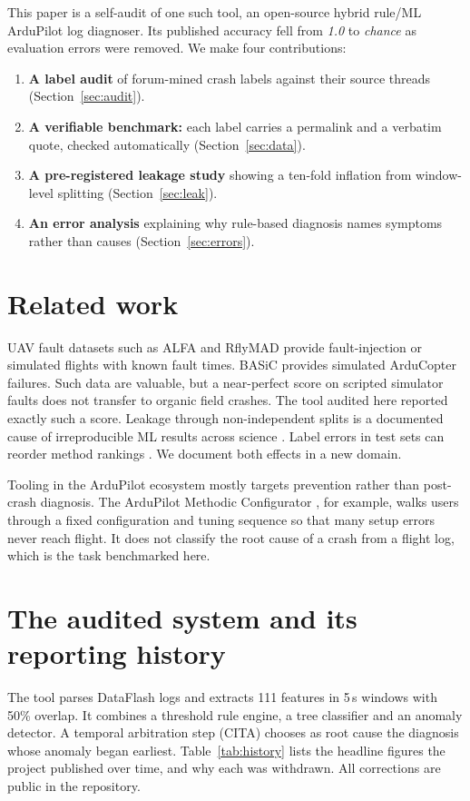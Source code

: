 \documentclass[10pt,a4paper]{article}
\begin{document}
This paper is a self-audit of one such tool, an open-source hybrid
rule/ML ArduPilot log diagnoser. Its published accuracy fell from
\emph{1.0} to \emph{chance} as evaluation errors were removed. We make four
contributions:
\begin{enumerate}
\item \textbf{A label audit} of forum-mined crash labels against their source
      threads (Section~\ref{sec:audit}).
\item \textbf{A verifiable benchmark:} each label carries a permalink and a
      verbatim quote, checked automatically (Section~\ref{sec:data}).
\item \textbf{A pre-registered leakage study} showing a ten-fold inflation
      from window-level splitting (Section~\ref{sec:leak}).
\item \textbf{An error analysis} explaining why rule-based diagnosis names
      symptoms rather than causes (Section~\ref{sec:errors}).
\end{enumerate}

\section{Related work}
UAV fault datasets such as ALFA \citep{keipour2019alfa} and RflyMAD
\citep{le2023rflymad} provide fault-injection or simulated flights with known
fault times. BASiC \citep{basic2024} provides simulated ArduCopter failures.
Such data are valuable, but a near-perfect score on scripted simulator faults
does not transfer to organic field crashes. The tool audited here reported
exactly such a score. Leakage through non-independent splits is a documented
cause of irreproducible ML results across science \citep{kapoor2023leakage}.
Label errors in test sets can reorder method rankings
\citep{northcutt2021labelerrors}. We document both effects in a new domain.

Tooling in the ArduPilot ecosystem mostly targets prevention rather than
post-crash diagnosis. The ArduPilot Methodic Configurator \citep{amc}, for
example, walks users through a fixed configuration and tuning sequence so that
many setup errors never reach flight. It does not classify the root cause of a
crash from a flight log, which is the task benchmarked here.

\section{The audited system and its reporting history}
The tool parses DataFlash logs and extracts 111 features in 5\,s windows
with 50\% overlap. It combines a threshold rule engine, a tree classifier and
an anomaly detector. A temporal arbitration step (CITA) chooses as root cause
the diagnosis whose anomaly began earliest. Table~\ref{tab:history} lists the
headline figures the project published over time, and why each was
withdrawn. All corrections are public in the repository.
\end{document}
